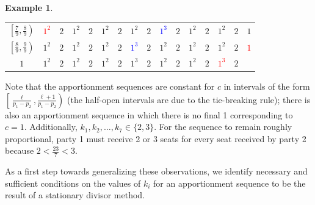 \documentclass[pdflatex,sn-mathphys-num]{sn-jnl}
\theoremstyle{thmstyleone}%
\theoremstyle{thmstyletwo}%
\newtheorem{example}{Example}%
\theoremstyle{thmstylethree}%
\begin{document}
\begin{example}
\begin{table}[tbh]
\begin{tabular}{c|*{15}c}
$\left[ \frac{7}{9}, \frac{8}{9} \right)$  & \textcolor{red}{$1^2$} & $2$ & $1^2$ & $2$ & $1^2$ & $2$ & $1^2$ & $2$ & \textcolor{blue}{$1^3$} & $2$ & $1^2$ & $2$ & $1^2$ & $2$ & $1$ \\
$\left[ \frac{8}{9}, \frac{9}{9} \right)$  & $1^2$ & $2$ & $1^2$ & $2$ & $1^2$ & $2$ & \textcolor{blue}{$1^3$} & $2$ & $1^2$ & $2$ & $1^2$ & $2$ & $1^2$ & $2$ & \textcolor{red}{$1$} \\
$1$  & $1^2$ & $2$ & $1^2$ & $2$ & $1^2$ & $2$ & $1^3$ & $2$ & $1^2$ & $2$ & $1^2$ & $2$ & \textcolor{red}{$1^3$} & $2$ &  
\end{tabular} 
\end{table} 
\end{example}

 Note that the apportionment sequences are constant for $c$ in intervals of the form $\left[\frac{\ell}{p_1-p_2}, \frac{\ell+1}{p_1-p_2}\right)$ (the half-open intervals are due to  the tie-breaking rule); there is also an apportionment sequence in which there is no final 1 corresponding to $c=1$.  Additionally,  $k_1, k_2, \ldots, k_7 \in \{2, 3\}$.  For the sequence to remain roughly proportional, party 1 must receive 2 or 3 seats for every seat received by party 2 because $2 < \frac{23}{7} < 3$.
  
 As a first step towards  generalizing these observations, we identify necessary and sufficient conditions on the values of $k_i$ for an apportionment sequence to be the result of a stationary divisor method.
\end{document}
